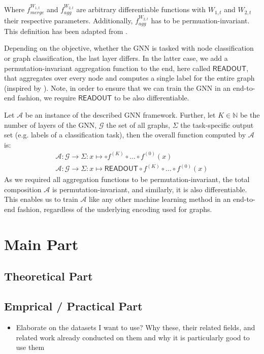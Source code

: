 \documentclass[11pt, dvipsnames, DIV=12]{scrreprt}
\theoremstyle{definition}
\begin{document}
\noindent Where $f^{W_{1,t}}_{merge}$ and $f^{W_{2,t}}_{agg}$ are arbitrary differentiable functions with $W_{1,t}$ and $W_{2,t}$ their respective parameters. Additionally, $f^{W_{2,t}}_{agg}$ has to be permuation-invariant. This definition has been adapted from \cite{Morris2021}.

\noindent Depending on the objective, whether the GNN is tasked with node classification or graph classification, the last layer differs. In the latter case, we add a permutation-invariant aggregation function to the end, here called $\textsf{READOUT}$, that aggregates over every node and computes a single label for the entire graph (inspired by \cite{Xu2018}). Note, in order to ensure that we can train the GNN in an end-to-end fashion, we require $\textsf{READOUT}$ to be also differentiable.

Let $\mathcal{A}$ be an instance of the described GNN framework. Further, let $K \in \mathbb{N}$ be the number of layers of the GNN, $\mathcal{G}$ the set of all graphs, $\Sigma$ the task-specific output set (e.g. labels of a classification task), then the overall function computed by $\mathcal{A}$ is:
\begin{align}
\mathcal{A}: \mathcal{G} \rightarrow \Sigma: x \mapsto \circ f^{(K)} \circ \ldots \circ f^{(0)}(x)\\
\mathcal{A}: \mathcal{G} \rightarrow \Sigma: x \mapsto \textsf{READOUT} \circ f^{(K)} \circ \ldots \circ f^{(0)}(x)
\end{align}
As we required all aggregation functions to be permutation-invariant, the total composition $\mathcal{A}$ is permutation-invariant, and similarly, it is also differentiable. This enables us to train $\mathcal{A}$ like any other machine learning method in an end-to-end fashion, regardless of the underlying encoding used for graphs.


\section{Main Part}
\subsection{Theoretical Part}

\subsection{Emprical / Practical Part}
\begin{itemize}
    \item Elaborate on the datasets I want to use? Why these, their related fields, and related work already conducted on them and why it is particularly good to use them

\end{itemize}
\end{document}
